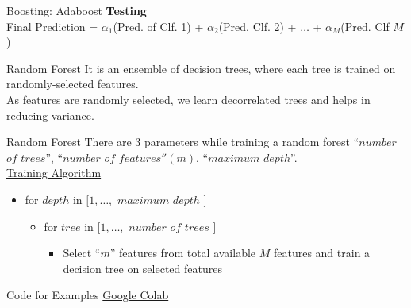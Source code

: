 \documentclass{beamer}
\begin{document}
	\begin{frame}{Boosting: Adaboost}
	\textbf{Testing}\\
	Final Prediction = $\alpha_1$(Pred. of Clf. 1) +  $\alpha_2$(Pred. Clf. 2) + $\dots$ +  $\alpha_M$(Pred. Clf $M$)
	\end{frame}
	

	\begin{frame}{Random Forest}
		It is an ensemble of decision trees, where each tree is trained on randomly-selected features.\\
		\vspace{1cm}
		As features are randomly selected, we learn decorrelated trees and helps in reducing variance.\\
	\end{frame}

	\begin{frame}{Random Forest}
	There are 3 parameters while training a random forest ``$number$ $of$ $trees$'', ``$number$ $of$ $features'' (m)$, ``$maximum$ $depth$''.\\
	\vspace{1cm}
	\underline{Training Algorithm}\\
	\begin{itemize}
		\item for $depth$ in $[1, \dots,$ $maximum$ $depth$ $]$
			\begin{itemize}
				\item for $tree$ in $[1, \dots,$ $number$ $of$ $trees$ $]$
				\begin{itemize}
					\item Select ``$m$'' features from total available $M$ features and train a decision tree on selected features
					
				\end{itemize}
			\end{itemize}
	\end{itemize}
	\end{frame}

	\begin{frame}{Code for Examples}
		\centering
		\href{https://colab.research.google.com/drive/1Yix-Hn1zqT6o-wOQkoiBhjKklzhJgekF}{Google Colab}
	\end{frame}
\end{document}

